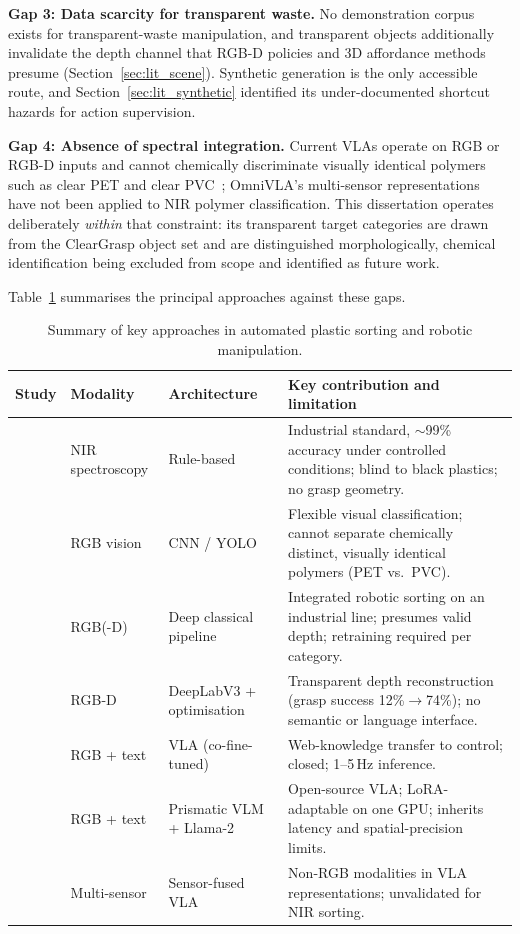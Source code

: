 \textbf{Gap 3: Data scarcity for transparent waste.} No demonstration corpus exists for transparent-waste manipulation, and transparent objects additionally invalidate the depth channel that RGB-D policies and 3D affordance methods presume (Section~\ref{sec:lit_scene}). Synthetic generation is the only accessible route, and Section~\ref{sec:lit_synthetic} identified its under-documented shortcut hazards for action supervision.

\textbf{Gap 4: Absence of spectral integration.} Current VLAs operate on RGB or RGB-D inputs and cannot chemically discriminate visually identical polymers such as clear PET and clear PVC~\citep{lubongo2024}; OmniVLA's multi-sensor representations~\citep{omnivla2025} have not been applied to NIR polymer classification. This dissertation operates deliberately \emph{within} that constraint: its transparent target categories are drawn from the ClearGrasp object set and are distinguished morphologically, chemical identification being excluded from scope and identified as future work.

Table~\ref{tab:lit_summary} summarises the principal approaches against these gaps.

\begin{table}[htbp]
\centering
\caption{Summary of key approaches in automated plastic sorting and robotic manipulation.}
\label{tab:lit_summary}
\renewcommand{\arraystretch}{1.3}
\begin{tabular}{@{}p{2.8cm}p{2.3cm}p{3.2cm}p{6.2cm}@{}}
\toprule
\textbf{Study} & \textbf{Modality} & \textbf{Architecture} & \textbf{Key contribution and limitation} \\
\midrule
\citet{lubongo2024} & NIR spectroscopy & Rule-based & Industrial standard, $\sim$99\% accuracy under controlled conditions; blind to black plastics; no grasp geometry. \\
\citet{kroell2022} & RGB vision & CNN / YOLO & Flexible visual classification; cannot separate chemically distinct, visually identical polymers (PET vs.\ PVC). \\
\citet{koskinopoulou2021} & RGB(-D) & Deep classical pipeline & Integrated robotic sorting on an industrial line; presumes valid depth; retraining required per category. \\
\citet{sajjan2020} & RGB-D & DeepLabV3 + optimisation & Transparent depth reconstruction (grasp success 12\%$\to$74\%); no semantic or language interface. \\
\citet{zitkovich2023} & RGB + text & VLA (co-fine-tuned) & Web-knowledge transfer to control; closed; 1--5\,Hz inference. \\
\citet{kim2024} & RGB + text & Prismatic VLM + Llama-2 & Open-source VLA; LoRA-adaptable on one GPU; inherits latency and spatial-precision limits. \\
\citet{omnivla2025} & Multi-sensor & Sensor-fused VLA & Non-RGB modalities in VLA representations; unvalidated for NIR sorting. \\
\bottomrule
\end{tabular}
\end{table}


